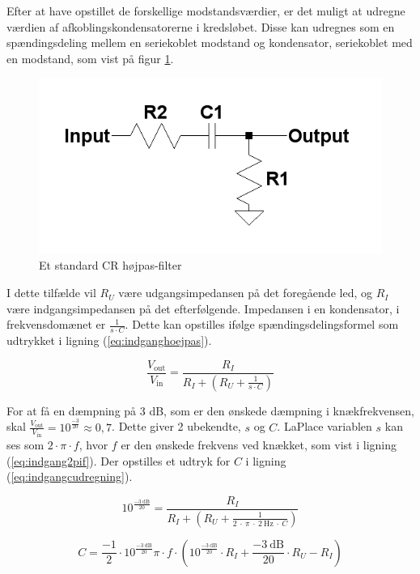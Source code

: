 Efter at have opstillet de forskellige modstandsværdier, er det muligt at udregne værdien af afkoblingskondensatorerne i kredsløbet. Disse kan udregnes som en spændingsdeling mellem en seriekoblet modstand og kondensator, seriekoblet med en modstand, som vist på figur \ref{crvd}.
\begin{figure}[h]
\centering
\includegraphics[scale=0.4]{teknisk/indgangsvaelger/hoejpasfilter.png}
\caption{Et standard CR højpas-filter}
\label{crvd}
\end{figure}
I dette tilfælde vil $R_U$ være udgangsimpedansen på det foregående led, og $R_I$ være indgangsimpedansen på det efterfølgende. Impedansen i en kondensator, i frekvensdomænet er $\frac{1}{s\cdot C}$. Dette kan opstilles ifølge spændingsdelingsformel som udtrykket i ligning (\ref{eq:indganghoejpas}).

\begin{equation}
\label{eq:indganghoejpas}
\frac{V_{\mathrm{out}}}{V_{\mathrm{in}}}=\frac{R_I}{R_I+\left(R_U + \frac{1}{s \cdot C}\right)}
\end{equation}

For at få en dæmpning på 3 dB, som er den ønskede dæmpning i knækfrekvensen, skal $\frac{V_{\mathrm{out}}}{V_{\mathrm{in}}}=10^{\frac{-3}{20}}\approx0,7$. 
Dette giver 2 ubekendte, $s$ og $C$. LaPlace variablen $s$ kan ses som $2\cdot \pi \cdot f$, hvor $f$ er den ønskede frekvens ved knækket, som vist i ligning (\ref{eq:indgang2pif}). Der opstilles et udtryk for $C$ i ligning (\ref{eq:indgangcudregning}).

\begin{equation}
\label{eq:indgang2pif}
10^{\frac{-3~\mathrm{dB}}{20}}=\frac{R_I}{R_I+\left(R_U + \frac{1}{2~\cdot~\pi~\cdot~2~\mathrm{Hz}~\cdot~ C}\right)}
\end{equation}

\begin{equation}
\label{eq:indgangcudregning}
C=\frac{-1}{2} \cdot 10^{\frac{-3~\mathrm{dB}}{20}} \pi \cdot f \cdot \left( 10^{\frac{-3~\mathrm{dB}}{20}} \cdot R_I + \frac{-3~\mathrm{dB}}{20} \cdot R_U - R_I \right)
\end{equation}

